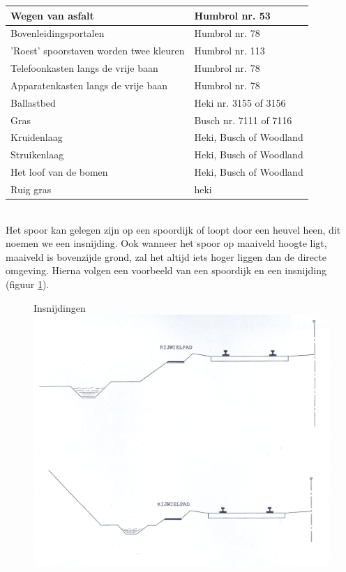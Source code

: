 \documentclass[12pt,a4paper]{report}
\begin{document}
\begin{tabular}{| l | l |}
\hline
\cellcolor[gray]{0.84}Wegen van asfalt&Humbrol nr. 53\\
\hline
\cellcolor[gray]{0.84}Bovenleidingsportalen&Humbrol nr. 78\\
\hline
\cellcolor[gray]{0.84}'Roest' spoorstaven  worden twee kleuren&Humbrol nr. 113\\
\hline
\cellcolor[gray]{0.84}Telefoonkasten langs de vrije baan&Humbrol nr. 78\\
\hline
\cellcolor[gray]{0.84}Apparatenkasten langs de vrije baan&Humbrol nr. 78\\
\hline
\cellcolor[gray]{0.84}Ballastbed&Heki nr. 3155 of 3156\\
\hline
\cellcolor[gray]{0.84}Gras&Busch nr. 7111 of 7116\\
\hline
\cellcolor[gray]{0.84}Kruidenlaag&Heki, Busch of Woodland\\
\hline
\cellcolor[gray]{0.84}Struikenlaag&Heki, Busch of Woodland\\
\hline
\cellcolor[gray]{0.84}Het loof van de bomen&Heki, Busch of Woodland\\
\hline
\cellcolor[gray]{0.84}Ruig gras&heki\\
\hline
\end{tabular}
\\

Het spoor kan gelegen zijn op een spoordijk of loopt door een heuvel heen, dit noemen we een insnijding. Ook wanneer het spoor op maaiveld hoogte ligt, maaiveld is bovenzijde grond, zal het altijd iets hoger liggen dan de directe omgeving. Hierna volgen een voorbeeld van een spoordijk en een insnijding (figuur \ref{figuur13}).

\begin{figure}[ht]
  \captionbox
  {Insnijdingen\label{figuur13}}
  {\includegraphics[scale=1.0]{images/rcu_figuur13_14}}
\end{figure}
\end{document}
